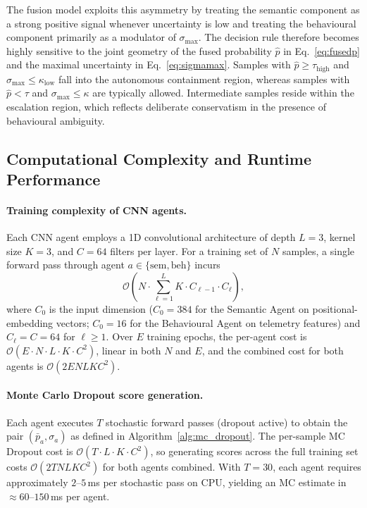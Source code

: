 \documentclass[3p]{elsarticle}
\begin{document}
The fusion model exploits this asymmetry by treating the semantic component as a strong positive signal whenever uncertainty is low and treating the behavioural component primarily as a modulator of \(\sigma_{\max}\). The decision rule therefore becomes highly sensitive to the joint geometry of the fused probability \(\hat{p}\) in Eq.~\eqref{eq:fusedp} and the maximal uncertainty in Eq.~\eqref{eq:sigmamax}. Samples with \(\hat{p} \ge \tau_{\mathrm{high}}\) and \(\sigma_{\max} \le \kappa_{\mathrm{low}}\) fall into the autonomous containment region, whereas samples with \(\hat{p} < \tau\) and \(\sigma_{\max} \le \kappa\) are typically allowed. Intermediate samples reside within the escalation region, which reflects deliberate conservatism in the presence of behavioural ambiguity.

\subsection*{Computational Complexity and Runtime Performance}

\paragraph{Training complexity of CNN agents.}
Each CNN agent employs a 1D convolutional architecture of depth $L=3$, kernel size $K=3$,
and $C=64$ filters per layer.
For a training set of $N$ samples, a single forward pass through agent
$a \in \{\mathrm{sem}, \mathrm{beh}\}$ incurs
\begin{equation}
  \mathcal{O}\!\left(N \cdot \sum_{\ell=1}^{L} K \cdot C_{\ell-1} \cdot C_{\ell}\right),
  \label{eq:cnn_fwd}
\end{equation}
where $C_0$ is the input dimension ($C_0 = 384$ for the Semantic Agent on positional-embedding
vectors; $C_0 = 16$ for the Behavioural Agent on telemetry features) and $C_\ell = C = 64$
for $\ell \ge 1$.
Over $E$ training epochs, the per-agent cost is
$\mathcal{O}(E \cdot N \cdot L \cdot K \cdot C^2)$, linear in both $N$ and $E$,
and the combined cost for both agents is $\mathcal{O}(2 E N L K C^2)$.

\paragraph{Monte Carlo Dropout score generation.}
Each agent executes $T$ stochastic forward passes (dropout active) to obtain the pair
$(\bar{p}_a, \sigma_a)$ as defined in Algorithm~\ref{alg:mc_dropout}.
The per-sample MC Dropout cost is $\mathcal{O}(T \cdot L \cdot K \cdot C^2)$, so generating
scores across the full training set costs $\mathcal{O}(2 T N L K C^2)$ for both agents
combined.
With $T = 30$, each agent requires approximately $2$--$5$\,ms per stochastic pass on CPU,
yielding an MC estimate in $\approx 60$--$150$\,ms per agent.
\end{document}
